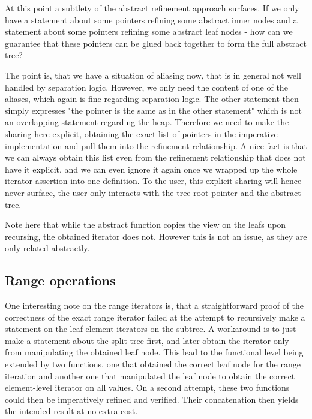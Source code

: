 \documentclass[a4paper,UKenglish,cleveref, autoref, thm-restate]{lipics-v2021}
\begin{document}
At this point a subtlety of the abstract refinement approach surfaces.
If we only have a statement about some pointers refining some abstract inner nodes
and a statement about some pointers refining some abstract leaf nodes - 
how can we guarantee that these pointers can be glued back together to form the
full abstract tree?

The point is, that we have a situation of aliasing now,
that is in general not well handled by separation logic.
However, we only need the content of one of the aliases, which again is fine
regarding separation logic.
The other statement then simply expresses "the pointer is the same as in the other statement"
which is not an overlapping statement regarding the heap.
Therefore we need to make the sharing here explicit,
obtaining the exact list of pointers in the imperative implementation
and pull them into the refinement relationship.
A nice fact is that we can always obtain this list even from the
refinement relationship that does not have it explicit,
and we can even ignore it again once we wrapped up the whole
iterator assertion into one definition.
To the user, this explicit sharing will hence never surface,
the user only interacts with the tree root pointer and the abstract tree.


Note here that while the abstract function copies the view on the leafs
upon recursing, the obtained iterator does not.
However this is not an issue, as they are only related abstractly.

\subsection{Range operations}
\label{sec:imperative_range}

One interesting note on the range iterators is, that a
straightforward proof of the correctness of the exact range iterator
failed at the attempt to recursively make a statement on
the leaf element iterators on the subtree.
A workaround is to just make a statement about the split tree first,
and later obtain the iterator only from manipulating the obtained leaf node.
This lead to the functional level being extended by two functions,
one that obtained the correct leaf node for the range iteration
and another one that manipulated the leaf node to obtain
the correct element-level iterator on all values.
On a second attempt, these two functions could then be imperatively
refined and verified.
Their concatenation then yields the intended result at no extra cost.
\end{document}
